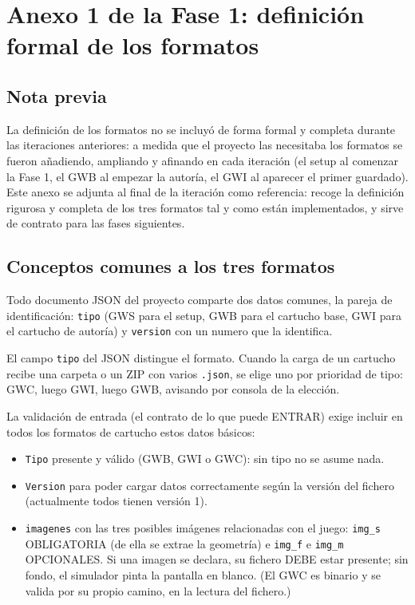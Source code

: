 \section*{Anexo 1 de la Fase 1: definición formal de los formatos}
\label{sec:F1A01}

\subsection*{Nota previa}
\label{sec:F1A01Nota}

La definición de los formatos no se incluyó de forma formal y
completa durante las iteraciones anteriores: a medida que el proyecto las
necesitaba los formatos se fueron añadiendo, ampliando y afinando en cada iteración
(el setup al comenzar la Fase 1, el GWB al empezar la autoría, el GWI al aparecer el primer guardado). Este anexo se adjunta al final de la iteración como referencia:
recoge la definición rigurosa y completa de los tres formatos tal y como están
implementados, y sirve de contrato para las fases siguientes.

\subsection*{Conceptos comunes a los tres formatos}
\label{sec:F1A01Comun}

Todo documento JSON del proyecto comparte dos datos comunes, la pareja de
identificación: \texttt{tipo} (GWS para el setup, GWB para el cartucho base, GWI para el 
cartucho de autoría) y \texttt{version} con un numero que la identifica. 

El campo \texttt{tipo} del JSON distingue el
formato. Cuando la carga de un cartucho recibe una carpeta o un ZIP con varios
\texttt{.json}, se elige uno por prioridad de tipo: GWC, luego GWI, luego
GWB, avisando por consola de la elección.

La validación de entrada (el contrato de lo que puede ENTRAR) exige incluir en todos los 
formatos de cartucho estos datos básicos:

\begin{itemize}
	\item \texttt{Tipo} presente y válido (GWB, GWI o GWC): sin tipo no se
	asume nada.
	\item \texttt{Version} para poder cargar datos correctamente según la versión del fichero (actualmente todos tienen versión 1).
	\item \texttt{imagenes} con las tres posibles imágenes relacionadas con el juego: \texttt{img\_s} OBLIGATORIA (de ella se extrae la geometría) e \texttt{img\_f} e \texttt{img\_m} OPCIONALES. Si una imagen se declara, su fichero DEBE estar presente; sin fondo, el simulador pinta la pantalla en blanco. (El GWC es binario y se valida por su propio camino, en la lectura del fichero.)
\end{itemize}

